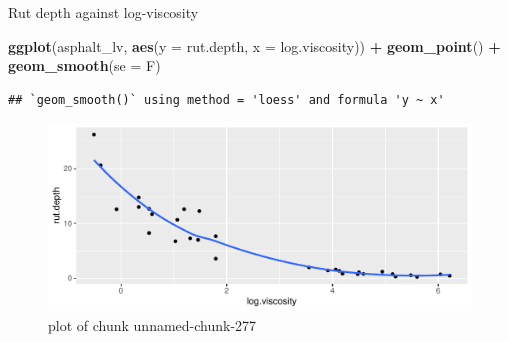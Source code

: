 \documentclass[ignorenonframetext,]{beamer}
\newenvironment{Shaded}{\begin{snugshade}}{\end{snugshade}}
\newcommand{\DataTypeTok}[1]{\textcolor[rgb]{0.13,0.29,0.53}{#1}}
\newcommand{\KeywordTok}[1]{\textcolor[rgb]{0.13,0.29,0.53}{\textbf{#1}}}
\newcommand{\NormalTok}[1]{#1}
\newcommand{\OperatorTok}[1]{\textcolor[rgb]{0.81,0.36,0.00}{\textbf{#1}}}
\newcommand{\StringTok}[1]{\textcolor[rgb]{0.31,0.60,0.02}{#1}}
\begin{document}
\begin{frame}[fragile]{Rut depth against log-viscosity}
\protect\hypertarget{rut-depth-against-log-viscosity}{}

\begin{Shaded}
\begin{Highlighting}[]
\KeywordTok{ggplot}\NormalTok{(asphalt_lv, }\KeywordTok{aes}\NormalTok{(}\DataTypeTok{y =}\NormalTok{ rut.depth, }\DataTypeTok{x =}\NormalTok{ log.viscosity)) }\OperatorTok{+}
\StringTok{  }\KeywordTok{geom_point}\NormalTok{() }\OperatorTok{+}\StringTok{ }\KeywordTok{geom_smooth}\NormalTok{(}\DataTypeTok{se =}\NormalTok{ F)}
\end{Highlighting}
\end{Shaded}

\begin{verbatim}
## `geom_smooth()` using method = 'loess' and formula 'y ~ x'
\end{verbatim}

\begin{figure}
\centering
\includegraphics{figure/unnamed-chunk-277-1.pdf}
\caption{plot of chunk unnamed-chunk-277}
\end{figure}

\end{frame}
\end{document}
